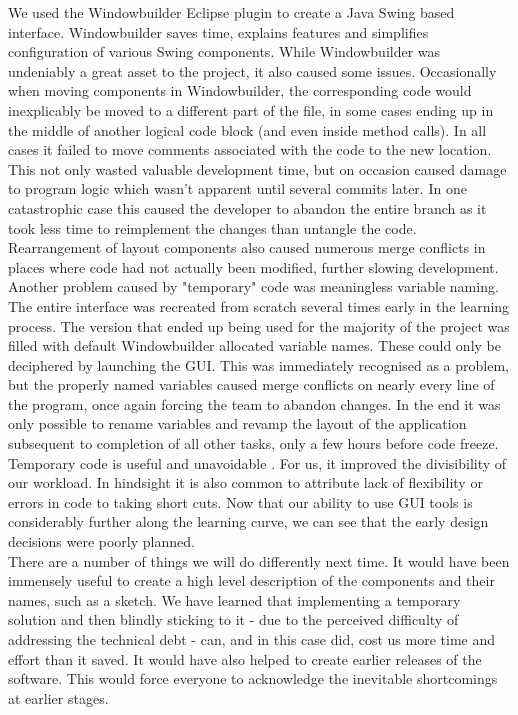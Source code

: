 \documentclass{l3proj}
\begin{document}
We used the Windowbuilder Eclipse plugin to create a Java Swing based interface. Windowbuilder saves time, explains features and simplifies configuration of various Swing components\cite{windowbuilder}. While Windowbuilder was undeniably a great asset to the project, it also caused some issues. Occasionally when moving components in Windowbuilder, the corresponding code would inexplicably be moved to a different part of the file, in some cases ending up in the middle of another logical code block (and even inside method calls). In all cases it failed to move comments associated with the code to the new location. This not only wasted valuable development time, but on occasion caused damage to program logic which wasn't apparent until several commits later. In one catastrophic case this caused the developer to abandon the entire branch as it took less time to reimplement the changes than untangle the code. Rearrangement of layout components also caused numerous merge conflicts in places where code had not actually been modified, further slowing development.\\
Another problem caused by "temporary" code was meaningless variable naming. The entire interface was recreated from scratch several times early in the learning process. The version that ended up being used for the majority of the project was filled with default Windowbuilder allocated variable names. These could only be deciphered by launching the GUI. This was immediately recognised as a problem, but the properly named variables caused merge conflicts on nearly every line of the program, once again forcing the team to abandon changes. In the end it was only possible to rename variables and revamp the layout of the application subsequent to completion of all other tasks, only a few hours before code freeze.\\
Temporary code is useful and unavoidable \cite{halpern}. For us, it improved the divisibility of our workload. In hindsight it is also common to attribute lack of flexibility or errors in code to taking short cuts\cite{stopford}. Now that our ability to use GUI tools is considerably further along the learning curve, we can see that the early design decisions were poorly planned. \\
There are a number of things we will do differently next time. It would have been immensely useful to create a high level description of the components and their names, such as a sketch. We have learned that implementing a temporary solution and then blindly sticking to it - due to the perceived difficulty of addressing the technical debt - can, and in this case did, cost us more time and effort than it saved. It would have also helped to create earlier releases of the software. This would force everyone to acknowledge the inevitable shortcomings at earlier stages.\\
\end{document}
